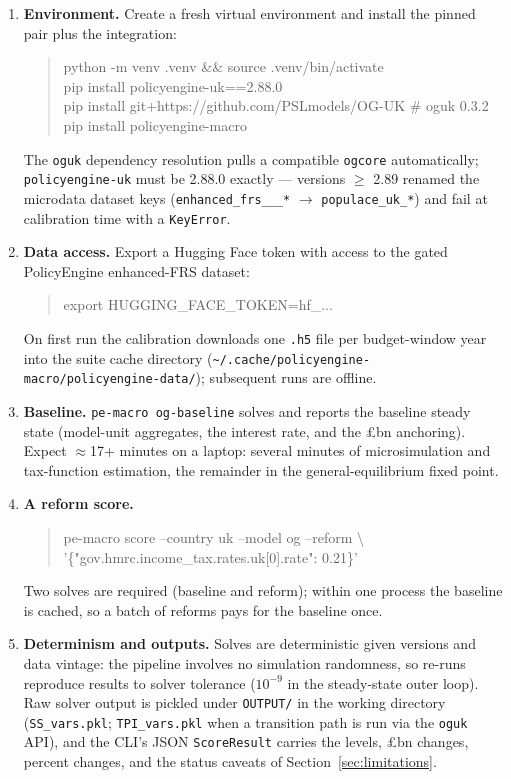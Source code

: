 \begin{enumerate}
\item \textbf{Environment.} Create a fresh virtual environment and install the pinned pair plus the integration:
\begin{quote}
\ttfamily
python -m venv .venv \&\& source .venv/bin/activate\\
pip install policyengine-uk==2.88.0\\
pip install git+https://github.com/PSLmodels/OG-UK \# oguk 0.3.2\\
pip install policyengine-macro
\end{quote}
The \texttt{oguk} dependency resolution pulls a compatible \texttt{ogcore} automatically; \texttt{policyengine-\allowbreak uk} must be 2.88.0 exactly --- versions $\geq$ 2.89 renamed the microdata dataset keys (\texttt{enhanced\_\allowbreak frs\_\_\_*} $\to$ \texttt{populace\_\allowbreak uk\_*}) and fail at calibration time with a \texttt{KeyError}.
\item \textbf{Data access.} Export a Hugging Face token with access to the gated PolicyEngine enhanced-FRS dataset:
\begin{quote}
\ttfamily export HUGGING\_FACE\_TOKEN=hf\_...
\end{quote}
On first run the calibration downloads one \texttt{.h5} file per budget-window year into the suite cache directory (\texttt{\textasciitilde/.cache/policyengine-macro/policyengine-data/}); subsequent runs are offline.
\item \textbf{Baseline.} \texttt{pe-macro og-baseline} solves and reports the baseline steady state (model-unit aggregates, the interest rate, and the \pounds bn anchoring). Expect $\approx$17+ minutes on a laptop: several minutes of microsimulation and tax-function estimation, the remainder in the general-equilibrium fixed point.
\item \textbf{A reform score.}
\begin{quote}
\ttfamily
pe-macro score --country uk --model og --reform \textbackslash\\
\hspace*{1.5em}'\{"gov.hmrc.income\_tax.rates.uk[0].rate": 0.21\}'
\end{quote}
Two solves are required (baseline and reform); within one process the baseline is cached, so a batch of reforms pays for the baseline once.
\item \textbf{Determinism and outputs.} Solves are deterministic given versions and data vintage: the pipeline involves no simulation randomness, so re-runs reproduce results to solver tolerance ($10^{-9}$ in the steady-state outer loop). Raw solver output is pickled under \texttt{OUTPUT/} in the working directory (\texttt{SS\_vars.pkl}; \texttt{TPI\_vars.pkl} when a transition path is run via the \texttt{oguk} API), and the CLI's JSON \texttt{ScoreResult} carries the levels, \pounds bn changes, percent changes, and the status caveats of Section~\ref{sec:limitations}.

\end{enumerate}

